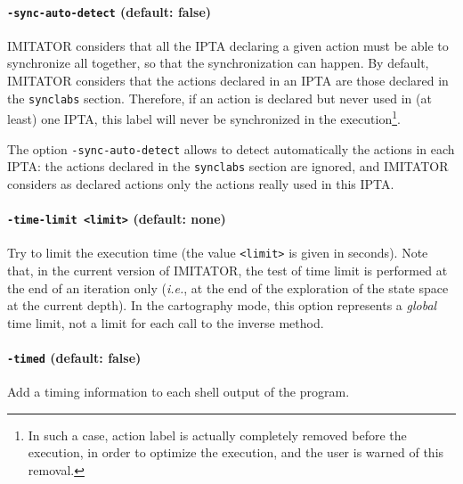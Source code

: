 \documentclass[a4paper,11pt]{report}
\makeatletter
\newcommand{\imitator}{\textsf{IMITATOR}}
\newcommand{\IPTA}{IPTA}
\newcommand{\styleIMI}[1]{\textcolor{imicolor}{\texttt{#1}}}
\newcommand{\styleOption}[1]{\textcolor{optioncolor}{\texttt{#1}}}
\newcommand{\ie}{\textcolor{colorok}{\textit{i.e.},\@}}
\makeatother
\begin{document}
\paragraph{\styleOption{-sync-auto-detect} (default: false)}
\imitator{} considers that all the \IPTA{} declaring a given action must be able to synchronize all together, so that the synchronization can happen.
By default, \imitator{} considers that the actions declared in an \IPTA{} are those declared in the \styleIMI{synclabs} section.
Therefore, if an action is declared but never used in (at least) one \IPTA{}, this label will never be synchronized in the execution\footnote{In such a case, action label is actually completely removed before the execution, in order to optimize the execution, and the user is warned of this removal.}.

The option \styleOption{-sync-auto-detect} allows to detect automatically the actions in each \IPTA{}: the actions declared in the \styleIMI{synclabs} section are ignored, and \imitator{} considers as declared actions only the actions really used in this \IPTA{}.


\paragraph{\styleOption{-time-limit <limit>} (default: none)}
Try to limit the execution time (the value \styleOption{<limit>} is given in seconds).
Note that, in the current version of \imitator{}, the test of time limit is performed at the end of an iteration only (\ie{} at the end of the exploration of the state space at the current depth).
In the cartography mode, this option represents a \emph{global} time limit, not a limit for each call to the inverse method.


\paragraph{\styleOption{-timed} (default: false)}
Add a timing information to each shell output of the program.



\end{document}

